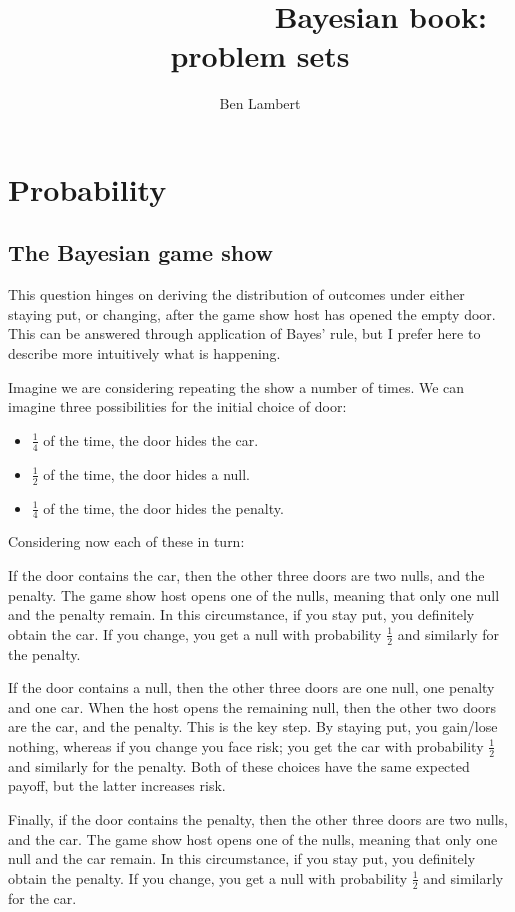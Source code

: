 \documentclass[11pt,fullpage]{book}
\title{\textbf{~~~~~~~~~~~~~~~}\newline Bayesian book: problem sets}
\author{Ben Lambert}
\begin{document}



\chapter{Probability}
\section{The Bayesian game show}
This question hinges on deriving the distribution of outcomes under either staying put, or changing, after the game show host has opened the empty door. This can be answered through application of Bayes' rule, but I prefer here to describe more intuitively what is happening.

Imagine we are considering repeating the show a number of times. We can imagine three possibilities for the initial choice of door:

\begin{itemize}
\item $\frac{1}{4}$ of the time, the door hides the car.
\item $\frac{1}{2}$ of the time, the door hides a null.
\item $\frac{1}{4}$ of the time, the door hides the penalty.
\end{itemize}

Considering now each of these in turn: 

If the door contains the car, then the other three doors are two nulls, and the penalty. The game show host opens one of the nulls, meaning that only one null and the penalty remain. In this circumstance, if you stay put, you definitely obtain the car. If you change, you get a null with probability $\frac{1}{2}$ and similarly for the penalty.

If the door contains a null, then the other three doors are one null, one penalty and one car. When the host opens the remaining null, then the other two doors are the car, and the penalty. This is the key step. By staying put, you gain/lose nothing, whereas if you change you face risk; you get the car with probability $\frac{1}{2}$ and similarly for the penalty. Both of these choices have the same expected payoff, but the latter increases risk.

Finally, if the door contains the penalty, then the other three doors are two nulls, and the car. The game show host opens one of the nulls, meaning that only one null and the car remain. In this circumstance, if you stay put, you definitely obtain the penalty. If you change, you get a null with probability $\frac{1}{2}$ and similarly for the car.
\end{document}

